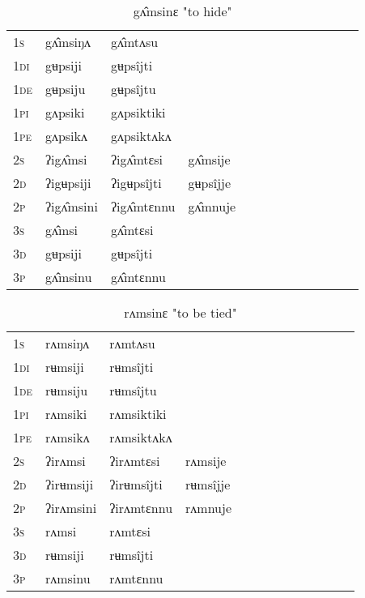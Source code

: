 \documentclass[oldfontcommands,oneside,a4paper,11pt]{article}
\begin{document}
\begin{table}[H]
\label{up.vr} \centering 
\caption{gʌ̂msinɛ  "to hide"  }
\begin{tabular}{l|l|l|l|l|l|l|l|l|l|l|l|l}  \toprule
\textsc{1s} &gʌ̂msiŋʌ &gʌ̂mtʌsu \\ 
\textsc{1di} &gʉpsiji &gʉpsîjti   \\
\textsc{1de} &gʉpsiju &gʉpsîjtu   \\ 
\textsc{1pi} &gʌpsiki &gʌpsiktiki   \\ 
\textsc{1pe} &gʌpsikʌ &gʌpsiktʌkʌ   \\ 
\textsc{2s} & ʔigʌ̂msi & ʔigʌ̂mtɛsi &gʌ̂msije  \\ 
\textsc{2d} & ʔigʉpsiji & ʔigʉpsîjti &gʉpsîjje    \\
\textsc{2p} & ʔigʌ̂msini  & ʔigʌ̂mtɛnnu &gʌ̂mnuje  \\ 
\textsc{3s} & gʌ̂msi & gʌ̂mtɛsi   \\ 
\textsc{3d} & gʉpsiji & gʉpsîjti   \\ 
\textsc{3p} & gʌ̂msinu  & gʌ̂mtɛnnu \\ 
\bottomrule
\end{tabular}
\end{table}


\begin{table}[H]
\label{um.vr} \centering 
\caption{rʌmsinɛ  "to be tied"  }
\begin{tabular}{l|l|l|l|l|l|l|l|l|l|l|l|l}  \toprule
\textsc{1s} &rʌmsiŋʌ &rʌmtʌsu \\ 
\textsc{1di} &rʉmsiji &rʉmsîjti   \\
\textsc{1de} &rʉmsiju &rʉmsîjtu   \\ 
\textsc{1pi} &rʌmsiki &rʌmsiktiki   \\ 
\textsc{1pe} &rʌmsikʌ &rʌmsiktʌkʌ   \\ 
\textsc{2s} & ʔirʌmsi & ʔirʌmtɛsi &rʌmsije  \\ 
\textsc{2d} & ʔirʉmsiji & ʔirʉmsîjti &rʉmsîjje    \\
\textsc{2p} & ʔirʌmsini  & ʔirʌmtɛnnu &rʌmnuje  \\ 
\textsc{3s} & rʌmsi & rʌmtɛsi   \\ 
\textsc{3d} & rʉmsiji & rʉmsîjti   \\ 
\textsc{3p} & rʌmsinu  & rʌmtɛnnu \\ 
\bottomrule
\end{tabular}
\end{table}
\end{document}
